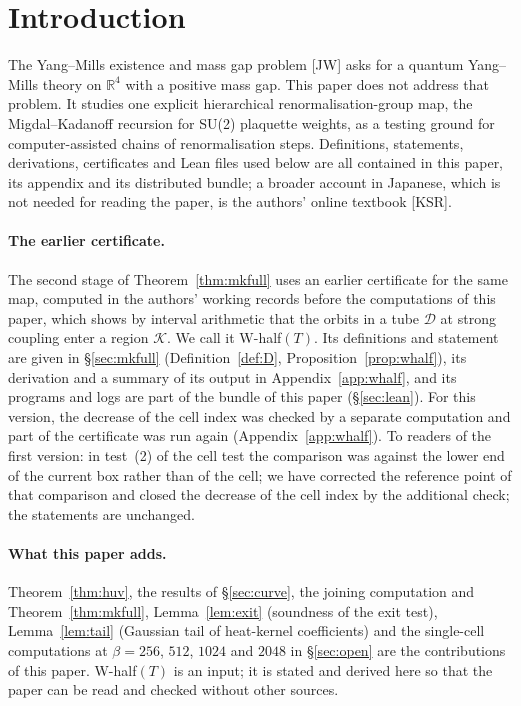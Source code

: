 \documentclass[11pt,a4paper]{article}
\theoremstyle{definition}
\theoremstyle{remark}
\newcommand{\cD}{\mathcal{D}}
\newcommand{\cK}{\mathcal{K}}
\begin{document}
\section*{Introduction}\label{sec:intro}
The Yang--Mills existence and mass gap problem [JW] asks for a quantum Yang--Mills theory on $\mathbb{R}^4$ with a positive mass gap.
This paper does not address that problem.
It studies one explicit hierarchical renormalisation-group map, the Migdal--Kadanoff recursion for SU(2) plaquette weights, as a testing ground for computer-assisted chains of renormalisation steps.
Definitions, statements, derivations, certificates and Lean files used below are all contained in this paper, its appendix and its distributed bundle; a broader account in Japanese, which is not needed for reading the paper, is the authors' online textbook [KSR].

\paragraph{The earlier certificate.}
The second stage of Theorem~\ref{thm:mkfull} uses an earlier certificate for the same map, computed in the authors' working records before the computations of this paper, which shows by interval arithmetic that the orbits in a tube $\cD$ at strong coupling enter a region $\cK$.
We call it W-half$(T)$.
Its definitions and statement are given in \S\ref{sec:mkfull} (Definition~\ref{def:D}, Proposition~\ref{prop:whalf}), its derivation and a summary of its output in Appendix~\ref{app:whalf}, and its programs and logs are part of the bundle of this paper (\S\ref{sec:lean}).
For this version, the decrease of the cell index was checked by a separate computation and part of the certificate was run again (Appendix~\ref{app:whalf}). To readers of the first version: in test~(2) of the cell test the comparison was against the lower end of the current box rather than of the cell; we have corrected the reference point of that comparison and closed the decrease of the cell index by the additional check; the statements are unchanged.

\paragraph{What this paper adds.}
Theorem~\ref{thm:huv}, the results of \S\ref{sec:curve}, the joining computation and Theorem~\ref{thm:mkfull}, Lemma~\ref{lem:exit} (soundness of the exit test), Lemma~\ref{lem:tail} (Gaussian tail of heat-kernel coefficients) and the single-cell computations at $\beta=256$, $512$, $1024$ and $2048$ in \S\ref{sec:open} are the contributions of this paper.
W-half$(T)$ is an input; it is stated and derived here so that the paper can be read and checked without other sources.
\end{document}
